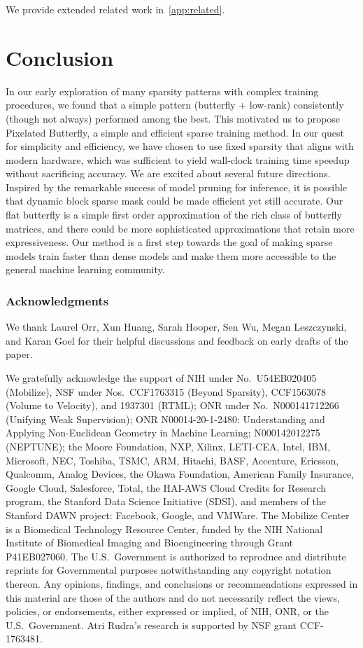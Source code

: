 We provide extended related work in~\ref{app:related}.

\section{Conclusion}
\label{sec:conclusion}

In our early exploration of many sparsity patterns with complex training procedures, we found that a simple pattern (butterfly + low-rank) consistently (though not always) performed among the best. This motivated us to propose Pixelated Butterfly, a simple and efficient sparse training method. In our quest for simplicity and efficiency, we have chosen to use fixed sparsity that aligns with modern hardware, which was sufficient to yield wall-clock training time speedup without sacrificing accuracy. We are excited about several future directions. Inspired by the remarkable success of model pruning for inference, it is possible that dynamic block sparse mask could be made efficient yet still accurate. Our flat butterfly is a simple first order approximation of the rich class of butterfly matrices, and there could be more sophisticated approximations that retain more expressiveness. Our method is a first step towards the goal of making sparse models train faster than dense models and make them more accessible to the general machine learning community.

\subsubsection*{Acknowledgments}

We thank Laurel Orr, Xun Huang, Sarah Hooper, Sen Wu, Megan Leszczynski, and Karan Goel for their helpful discussions and feedback on early drafts of the paper.

We gratefully acknowledge the support of NIH under No.\ U54EB020405 (Mobilize), NSF under Nos.\ CCF1763315 (Beyond Sparsity), CCF1563078 (Volume to Velocity), and 1937301 (RTML); ONR under No.\ N000141712266 (Unifying Weak Supervision); ONR N00014-20-1-2480: Understanding and Applying Non-Euclidean Geometry in Machine Learning; N000142012275 (NEPTUNE); the Moore Foundation, NXP, Xilinx, LETI-CEA, Intel, IBM, Microsoft, NEC, Toshiba, TSMC, ARM, Hitachi, BASF, Accenture, Ericsson, Qualcomm, Analog Devices, the Okawa Foundation, American Family Insurance, Google Cloud, Salesforce, Total, the HAI-AWS Cloud Credits for Research program, the Stanford Data Science Initiative (SDSI), and members of the Stanford DAWN project: Facebook, Google, and VMWare. The Mobilize Center is a Biomedical Technology Resource Center, funded by the NIH National Institute of Biomedical Imaging and Bioengineering through Grant P41EB027060. The U.S.\ Government is authorized to reproduce and distribute reprints for Governmental purposes notwithstanding any copyright notation thereon. Any opinions, findings, and conclusions or recommendations expressed in this material are those of the authors and do not necessarily reflect the views, policies, or endorsements, either expressed or implied, of NIH, ONR, or the U.S.\ Government. Atri Rudra’s research is supported by NSF grant CCF-1763481.


